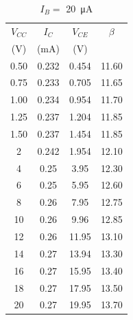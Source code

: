 \begin{table}[hbtp]
  \centering
  \begin{tabular}{cccc}
    $V_{CC}$ & $I_C$     & $V_{CE}$ & $\beta$ \\
    (\si{V}) & (\si{mA}) & (\si{V}) &         \\
    \hline
    0.50     & 0.232     & 0.454    & 11.60   \\
    0.75     & 0.233     & 0.705    & 11.65   \\
    1.00     & 0.234     & 0.954    & 11.70   \\
    1.25     & 0.237     & 1.204    & 11.85   \\
    1.50     & 0.237     & 1.454    & 11.85   \\
    2        & 0.242     & 1.954    & 12.10   \\
    4        & 0.25      & 3.95     & 12.30   \\
    6        & 0.25      & 5.95     & 12.60   \\
    8        & 0.26      & 7.95     & 12.75   \\
    10       & 0.26      & 9.96     & 12.85   \\
    12       & 0.26      & 11.95    & 13.10   \\
    14       & 0.27      & 13.94    & 13.30   \\
    16       & 0.27      & 15.95    & 13.40   \\
    18       & 0.27      & 17.95    & 13.50   \\
    20       & 0.27      & 19.95    & 13.70   \\
  \end{tabular}
  \caption{\label{tab:1} $I_B = $ \SI{20}{\micro\ampere}}
\end{table}

